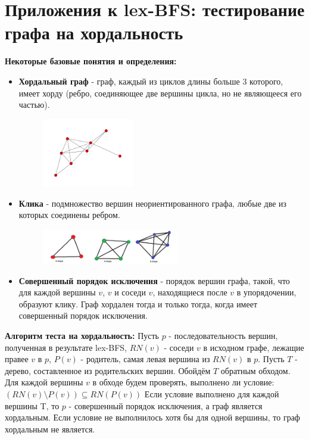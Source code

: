 \documentclass[a4paper,14pt]{article}
\begin{document}
\section{Приложения к lex-BFS: тестирование графа на хордальность}
	\textbf{Некоторые базовые понятия и определения:} 
\begin{itemize}
	\item \textbf{Хордальный граф} - граф, каждый из циклов длины больше 3 которого, имеет хорду (ребро, соединяющее две вершины цикла, но не являющееся его частью).
	\begin{figure}[h!]
		\centering
		\includegraphics[width=40mm]{img/hord.png}
	\end{figure}
	\item \textbf{Клика} - подмножество вершин неориентированного графа, любые две из которых соединены ребром.
	\begin{figure}[h!]
		\centering
		\includegraphics[width=60mm]{img/clique.png}
	\end{figure}
	\item \textbf{Совершенный порядок исключения} - порядок вершин графа, такой, что для каждой вершины $v$, $v$ и соседи $v$, находящиеся после $v$ в упорядочении, образуют клику. Граф хордален тогда и только тогда, когда имеет совершенный порядок исключения.
\end{itemize}
	 \textbf{Алгоритм теста на хордальность:}
	\newline
	\newline  \tab \tab  Пусть $p$ - последовательность вершин, полученная в результате lex-BFS, $RN(v)$ - соседи $v$ в исходном графе, лежащие правее $v$ в $p$, $P(v)$ - родитель, самая левая вершина из $RN(v)$ в $p$. 
	\newline  \tab \tab  Пусть $T$ - дерево, составленное из родительских вершин. Обойдём $T$ обратным обходом. Для каждой вершины $v$ в обходе будем проверять, выполнено ли условие: $(RN(v)\setminus P(v)) \subseteq RN(P(v))$
	\newline  \tab \tab Если условие выполнено для каждой вершины T, то $p$ - совершенный порядок исключения, а граф является хордальным. Если условие не выполнилось хотя бы для одной вершины, то граф хордальным не является.
\end{document}

